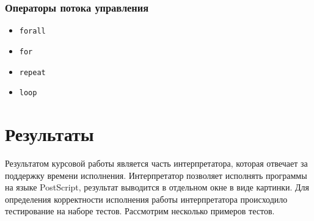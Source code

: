 \documentclass[14pt]{extarticle}
\begin{document}
\subsubsection*{Операторы потока управления}
\begin{itemize}
\item \texttt{forall}
\item \texttt{for}
\item \texttt{repeat}
\item \texttt{loop}
\end{itemize}
\fi
\section{Результаты}
Результатом курсовой работы является часть интерпретатора, которая отвечает за поддержку времени исполнения. Интерпретатор позволяет исполнять программы на языке PostScript, результат выводится в отдельном окне в виде картинки. Для определения корректности исполнения работы интерпретатора происходило тестирование на наборе тестов. Рассмотрим несколько примеров тестов.
\end{document}
